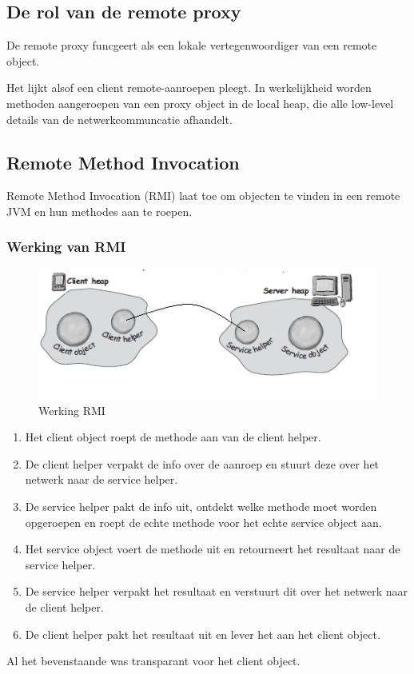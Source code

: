 \documentclass[a4paper,12pt]{article}
\begin{document}
\subsection{De rol van de remote proxy}
De remote proxy funcgeert als een lokale vertegenwoordiger van een remote object.

Het lijkt alsof een client remote-aanroepen pleegt.
In werkelijkheid worden methoden aangeroepen van een proxy object in de local heap, die alle low-level details van de netwerkcommuncatie afhandelt.

\subsection{Remote Method Invocation}
Remote Method Invocation (RMI) laat toe om objecten te vinden in een remote JVM en hun methodes aan te roepen.

\subsubsection{Werking van RMI}
\begin{figure}[H]
\centering
  	\includegraphics[width=.44\linewidth]{img/Proxy/RMIWerking.png}
  	\caption{Werking RMI}
  	\label{fig:RMIWerking}
\end{figure}
\begin{enumerate}
\item Het client object roept de methode aan van de client helper.
\item De client helper verpakt de info over de aanroep en stuurt deze over het netwerk naar de service helper.
\item De service helper pakt de info uit, ontdekt welke methode moet worden opgeroepen en roept de echte methode voor het echte service object aan.
\item Het service object voert de methode uit en retourneert het resultaat naar de service helper.
\item De service helper verpakt het resultaat en verstuurt dit over het netwerk naar de client helper.
\item De client helper pakt het resultaat uit en lever het aan het client object.
\end{enumerate}
Al het bevenstaande was transparant voor het client object.
\end{document}
